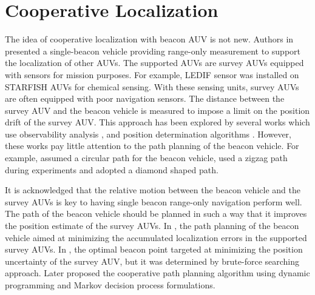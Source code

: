 \section{Cooperative Localization}

The idea of cooperative localization with beacon AUV is not new.
Authors in \cite{Gao2010,William2014Journal} presented a single-beacon vehicle providing range-only measurement to support the localization of other AUVs. The supported AUVs are survey AUVs equipped with sensors for mission purposes. For example, LEDIF sensor \cite{NgLEDIF} was installed on STARFISH AUVs \cite{STARFISH} for chemical sensing. With these sensing units, survey AUVs are often equipped with poor navigation sensors. The distance between the survey AUV and the beacon vehicle is measured to impose a limit on the position drift of the survey AUV. This approach has been explored by several works which use observability analysis \cite{Antonelli2010,Song1999}, and position determination algorithms \cite{Gadre2004,Alleyne2000}. However, these works pay little attention to the path planning of the beacon vehicle. For example,  \cite{Alleyne2000} assumed a circular path for the beacon vehicle, \cite{Fallon2010} used a zigzag path during experiments and \cite{Webster2012} adopted a diamond shaped path.

It is acknowledged that the relative motion between the beacon vehicle and the survey AUVs is key to having single beacon range-only navigation perform well. The path of the beacon vehicle should be planned in such a way that it improves the position estimate of the survey AUVs. In \cite{chitre2010}, the path planning of the beacon vehicle aimed at minimizing the accumulated localization errors in the supported survey AUVs. In \cite{Bahr2009beacon}, the optimal beacon point targeted at minimizing the position uncertainty of the survey AUV, but it was determined by brute-force searching approach. Later \cite{William2014Journal} proposed the cooperative path planning algorithm using dynamic programming and Markov decision process formulations.

